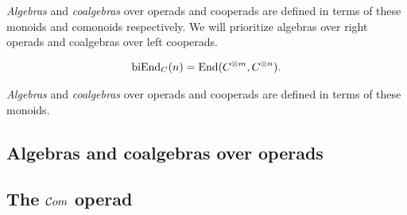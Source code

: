 \textit{Algebras} and \textit{coalgebras} over operads and cooperads are defined in terms of these monoids and comonoids respectively.
We will prioritize algebras over right operads and coalgebras over left cooperads.




\begin{gather*}
\mathrm{biEnd}_C(n) = \mathrm{End}(C^{\otimes m}, C^{\otimes n}).
\end{gather*}

\textit{Algebras} and \textit{coalgebras} over operads and cooperads are defined in terms of these monoids.





\subsection{Algebras and coalgebras over operads}


\subsection{The $\mathcal{C}om$ operad}


